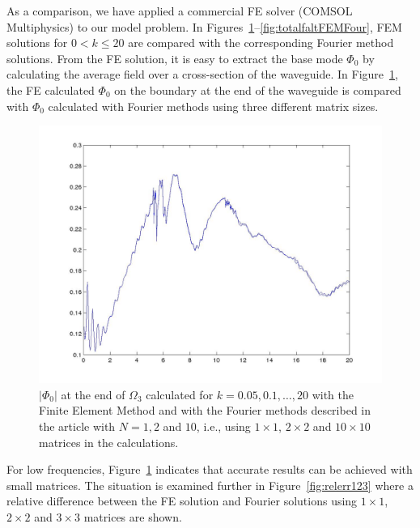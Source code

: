 \documentclass[numreferences]{kluwer}
\providecommand{\abs}[1]{\left\lvert#1\right\rvert}
\renewcommand{\Phi}{\varPhi}
\renewcommand{\Phi}{\varPhi}
\begin{document}
As a comparison, we have applied a commercial FE solver (COMSOL
Multiphysics) to our model problem. In
Figures~\ref{fig:FEMvsFourier}--\ref{fig:totalfaltFEMFour}, FEM
solutions for $0<k\le20$ are compared with the corresponding Fourier
method solutions. From the FE solution, it is easy to extract the base
mode $\Phi_0$ by calculating the average field over a cross-section of
the waveguide. In Figure~\ref{fig:FEMvsFourier}, the FE calculated
$\Phi_0$ on the boundary at the end of the waveguide is compared with
$\Phi_0$ calculated with Fourier methods using three different matrix
sizes.
\begin{figure}[htb]
  \centering
  \includegraphics[width=\linewidth]{FEMvsFourier}
  \caption{$\abs{\Phi_{0}}$ at the end of $\Omega_3$ calculated for
    $k=0.05,0.1,\dots,20$ with the Finite Element Method and with the
    Fourier methods described in the article with $N=1,2$ and $10$,
    i.e., using $1\times1$, $2\times2$ and $10\times10$ matrices in
    the calculations.}
  \label{fig:FEMvsFourier}
\end{figure}

For low frequencies, Figure~\ref{fig:FEMvsFourier} indicates that
accurate results can be achieved with small matrices. The situation is
examined further in Figure~\ref{fig:relerr123} where a relative
difference between the FE solution and Fourier solutions using
$1\times1$, $2\times2$ and $3\times3$ matrices are shown.
\end{document}
